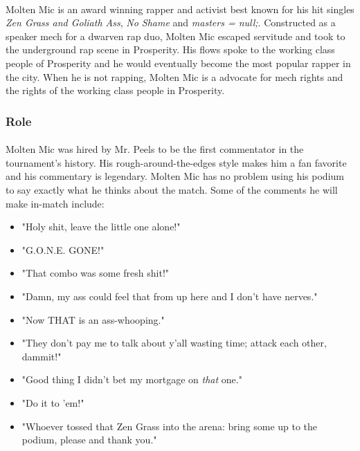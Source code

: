 \paragraph{} Molten Mic is an award winning rapper and activist best known for his hit singles \textit{Zen Grass and Goliath Ass}, \textit{No Shame} and \textit{masters = null;}. Constructed as a speaker mech for a dwarven rap duo, Molten Mic escaped servitude and took to the underground rap scene in Prosperity. His flows spoke to the working class people of Prosperity and he would eventually become the most popular rapper in the city. When he is not rapping, Molten Mic is a advocate for mech rights and the rights of the working class people in Prosperity.

\pagebreak

\subsubsection{Role}

\paragraph{} Molten Mic was hired by Mr. Peels to be the first commentator in the tournament's history. His rough-around-the-edges style makes him a fan favorite and his commentary is legendary. Molten Mic has no problem using his podium to say exactly what he thinks about the match. Some of the comments he will make in-match include:

\begin{itemize}
    \item "Holy shit, leave the little one alone!"
    \item "G.O.N.E. GONE!"
    \item "That combo was some fresh shit!"
    \item "Damn, my ass could feel that from up here and I don't have nerves."
    \item "Now THAT is an ass-whooping."
    \item "They don't pay me to talk about y'all wasting time; attack each other, dammit!"
    \item "Good thing I didn't bet my mortgage on \textit{that} one."
    \item "Do it to 'em!"
    \item "Whoever tossed that Zen Grass into the arena: bring some up to the podium, please and thank you."
\end{itemize}

